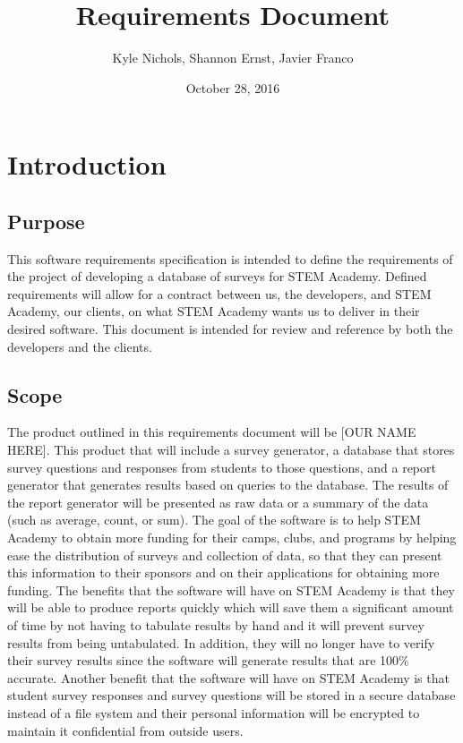 \documentclass[letterpaper,10pt,titlepage, draftclsnofoot,onecolumn]{IEEEtran}
\begin{document}
\title{Requirements Document}
\author{Kyle Nichols, Shannon Ernst, Javier Franco}
\date{October 28, 2016}
\maketitle
\section{Introduction}
\subsection{Purpose}
This software requirements specification is intended to define the requirements of the project of developing a database 
of surveys for STEM Academy. Defined requirements will allow for a contract between us, the developers, and STEM Academy, 
our clients, on what STEM Academy wants us to deliver in their desired software. This document is intended for review and
reference by both the developers and the clients.
\subsection{Scope}
The product outlined in this requirements document will be [OUR NAME HERE].
This product that will include a survey generator, a database that stores survey questions and responses from students to those questions, and a report generator that generates results based on queries to the database.  
The results of the report generator will be presented as raw data or a summary of the data (such as average, count, or sum).  
The goal of the software is to help STEM Academy to obtain more funding for their camps, clubs, and programs by helping ease the distribution of surveys and collection of data, so that they can present this information to their sponsors and on their applications for obtaining more funding. 
The benefits that the software will have on STEM Academy is that they will be able to produce reports quickly which will save them a significant amount of time by not having to tabulate results by hand and it will prevent survey results from being untabulated.
In addition, they will no longer have to verify their survey results since the software will generate results that are 100\% accurate.
Another benefit that the software will have on STEM Academy is that student survey responses and survey questions will be stored in a secure database instead of a file system and their personal information will be encrypted to maintain it confidential from outside users. 
\end{document}
